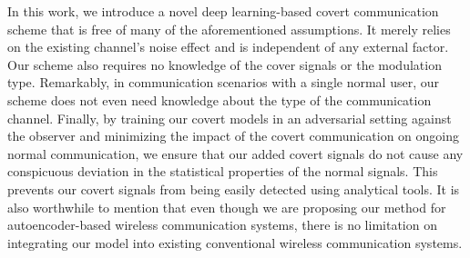 In this work, we introduce a novel deep learning-based covert communication scheme that is free of many of the aforementioned assumptions. It merely relies on the existing channel's noise effect and is independent of any external factor. Our scheme also requires no knowledge of the cover signals or the modulation type. Remarkably, in communication scenarios with a single normal user, our scheme does not even need knowledge about the type of the communication channel. Finally, by training our covert models in an adversarial setting against the observer and minimizing the impact of the covert communication on ongoing normal communication, we ensure that our added covert signals do not cause any conspicuous deviation in the statistical properties of the normal signals. This prevents our covert signals from being easily detected using analytical tools. It is also worthwhile to mention that even though we are proposing our method for autoencoder-based wireless communication systems, there is no limitation on integrating our model into existing conventional wireless communication systems.

